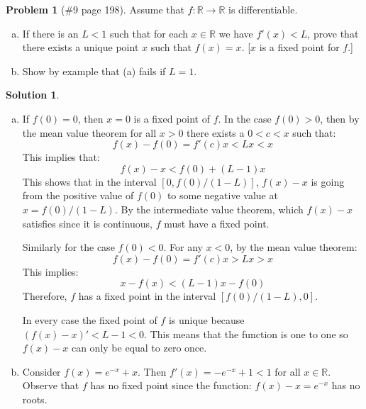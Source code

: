 \documentclass{article}
\theoremstyle{definition}
\newtheorem*{soln}{Solution}
\newtheorem*{prob}{Problem}
\theoremstyle{theorem}
\newcommand{\R}{\mathbb{R}}
\begin{document}
\begin{prob}[\#9 page 198]
    Assume that $f: \R \to \R$ is differentiable.
    \begin{enumerate}[(a)]
        \item If there is an $L<1$ such that for each $x\in \R$ we have $f'(x)<L$, prove that there exists a unique point $x$ such that $f(x) =x$. [$x$ is a fixed point for $f$.]        
        \item Show by example that (a) fails if $L=1$.
    \end{enumerate}
\end{prob}
\begin{soln}
    \begin{enumerate}[(a)]
        \item If $f(0)=0$, then $x=0$ is a fixed point of $f$. In the case $f(0)>0$, then by the mean value theorem for all $x>0$ there exists a $0< c< x$ such that:
            $$f(x) - f(0) = f'(c)x < Lx < x$$
            This implies that:
            $$f(x) -x < f(0) +(L-1)x$$
            This shows that  in the interval $[0,f(0)/(1-L)]$, $f(x) -x$ is going from the positive value of $f(0)$ to some negative value at $x=f(0)/(1-L)$. By the intermediate value theorem, which $f(x) - x$ satisfies since it is continuous, $f$ must have a fixed point.

            Similarly for the case $f(0)<0$. For any $x<0$, by the mean value theorem:
            $$f(x) - f(0) = f'(c)x > Lx > x$$
            This implies:
            $$x-f(x) < (L-1)x -f(0)$$
            Therefore, $f$ has a fixed point in the interval $[f(0)/(1-L), 0]$.

            In every case the fixed point of $f$ is  unique because $(f(x)-x)' < L-1<0$. This means that the function is one to one so $f(x)-x$ can only be equal to zero once.

        \item Consider $f(x) = e^{-x } +x$. Then $f'(x) = -e^{-x }+1<1$ for all $x\in \R$. Observe that $f$ has no fixed point since the function: $f(x)-x = e^{-x }$ has no roots.
    \end{enumerate}
\end{soln}
\vspace{1in}
\end{document}
